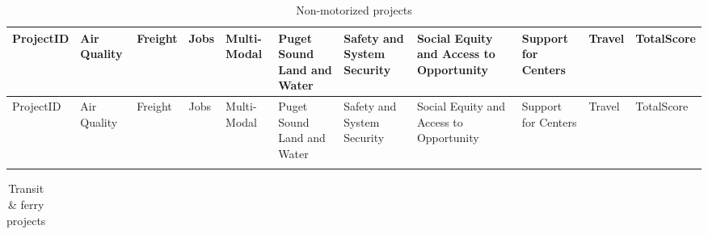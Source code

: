 \documentclass[10pt, letterpaper, final, twoside, onecolumn]{memoir}%
\begin{document}
\clearpage
\begin{landscape}
\pagestyle{empty}


{\scriptsize
\begin{longtable}{>{\raggedright\arraybackslash}p{2.9pc}>{\raggedright\arraybackslash}p{3.5pc}>{\raggedright\arraybackslash}p{3.5pc}>{\raggedright\arraybackslash}p{3.5pc}>{\raggedright\arraybackslash}p{3.5pc}>{\raggedright\arraybackslash}p{3.5pc}>{\raggedright\arraybackslash}p{3.5pc}>{\raggedright\arraybackslash}p{3.5pc}>{\raggedright\arraybackslash}p{3.5pc}>{\raggedright\arraybackslash}p{3.5pc}>{\raggedright\arraybackslash}p{3.5pc}}

\caption{ Non-motorized projects} \\

\toprule

ProjectID & Air Quality & Freight & Jobs & Multi-Modal & Puget Sound Land and Water & Safety and System Security & Social Equity and Access to Opportunity & Support for Centers & Travel & TotalScore \\ \midrule
\endfirsthead

\toprule
ProjectID & Air Quality & Freight & Jobs & Multi-Modal & Puget Sound Land and Water & Safety and System Security & Social Equity and Access to Opportunity & Support for Centers & Travel & TotalScore \\ \midrule
\endhead

\bottomrule
\endfoot

\bottomrule
\endlastfoot



\end{longtable}}




\clearpage
{\scriptsize
\begin{longtable}{>{\raggedright\arraybackslash}p{2.9pc}>{\raggedright\arraybackslash}p{3.5pc}>{\raggedright\arraybackslash}p{3.5pc}>{\raggedright\arraybackslash}p{3.5pc}>{\raggedright\arraybackslash}p{3.5pc}>{\raggedright\arraybackslash}p{3.5pc}>{\raggedright\arraybackslash}p{3.5pc}>{\raggedright\arraybackslash}p{3.5pc}>{\raggedright\arraybackslash}p{3.5pc}>{\raggedright\arraybackslash}p{3.5pc}>{\raggedright\arraybackslash}p{3.5pc}}

\caption{Transit \& ferry projects} \\

\toprule


\end{longtable}}
\end{landscape}
\end{document}
